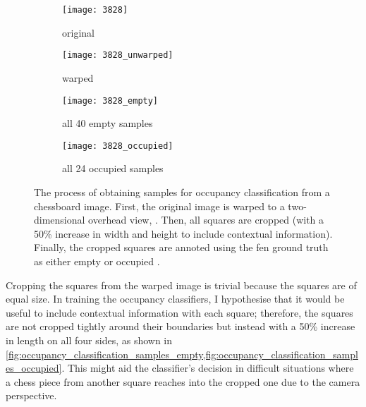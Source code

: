 \documentclass[../report.tex]{subfiles}
\begin{document}
\begin{figure}
    \centering
    \begin{subfigure}[b]{0.47\textwidth}
        \centering
        \texttt{[image: 3828]}
        \caption{original}
        \label{fig:occupancy_classification_samples_original}
    \end{subfigure}
    \hfill
    \begin{subfigure}[b]{0.47\textwidth}
        \centering
        \texttt{[image: 3828\_unwarped]}
        \caption{warped}
        \label{fig:occupancy_classification_samples_warped}
    \end{subfigure}
    
    \bigskip
    \begin{subfigure}[b]{0.47\textwidth}
        \centering
        \texttt{[image: 3828\_empty]}
        \caption{all 40 empty samples}
        \label{fig:occupancy_classification_samples_empty}
    \end{subfigure}
    \hfill
    \begin{subfigure}[b]{0.47\textwidth}
        \centering
        \texttt{[image: 3828\_occupied]}
        \caption{all 24 occupied samples}
        \label{fig:occupancy_classification_samples_occupied}
    \end{subfigure}
    \caption[The process of obtaining samples for occupancy classification from a chessboard image.]{The process of obtaining samples for occupancy classification from a chessboard image. First, the original image  is warped to a two-dimensional overhead view, . Then, all squares are cropped (with a 50\% increase in width and height to include contextual information). Finally, the cropped squares are annoted using the \gls{fen} ground truth as either empty  or occupied .}
    \label{fig:occupancy_classification_samples}
\end{figure}

Cropping the squares from the warped image is trivial because the squares are of equal size.
In training the occupancy classifiers, I hypothesise that it would be useful to include contextual information with each square; therefore, the squares are not cropped tightly around their boundaries but instead with a 50\% increase in length on all four sides, as shown in \cref{fig:occupancy_classification_samples_empty,fig:occupancy_classification_samples_occupied}.
This might aid the classifier's decision in difficult situations where a chess piece from another square reaches into the cropped one due to the camera perspective.
\end{document}
